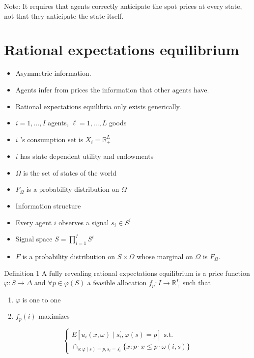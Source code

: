 \documentclass[10pt]{article}
\begin{document}
Note: It requires that agents correctly anticipate the spot prices at every state, not that they anticipate the state itself.

\section*{Rational expectations equilibrium}
\begin{itemize}
  \item Asymmetric information.
  \item Agents infer from prices the information that other agents have.
  \item Rational expectations equilibria only exists generically.
  \item $i=1, \ldots, I$ agents, $\ell=1, \ldots, L$ goods
  \item $i$ 's consumption set is $X_{i}=\mathbb{R}_{+}^{L}$
  \item $i$ has state dependent utility and endowments
  \item $\Omega$ is the set of states of the world
  \item $F_{\Omega}$ is a probability distribution on $\Omega$
  \item Information structure
  \item Every agent $i$ observes a signal $s_{i} \in S^{i}$
  \item Signal space $S=\prod_{i=1}^{I} S^{i}$
  \item $F$ is a probability distribution on $S \times \Omega$ whose marginal on $\Omega$ is $F_{\Omega}$.
\end{itemize}

Definition 1 A fully revealing rational expectations equilibrium is a price function $\varphi: S \rightarrow \Delta$ and $\forall p \in \varphi(S)$ a feasible allocation $f_{p}: I \rightarrow \mathbb{R}_{+}^{L}$ such that

\begin{enumerate}
  \item $\varphi$ is one to one
  \item $f_{p}(i)$ maximizes
\end{enumerate}

$$
\left\{\begin{array}{l}
E\left[u_{i}(x, \omega) \mid s_{i}^{\prime}, \varphi(s)=p\right] \text { s.t. } \\
\cap_{s: \varphi(s)=p, s_{i}=s_{i}^{\prime}}\{x: p \cdot x \leq p \cdot \omega(i, s)\}
\end{array}\right.
$$
\end{document}
